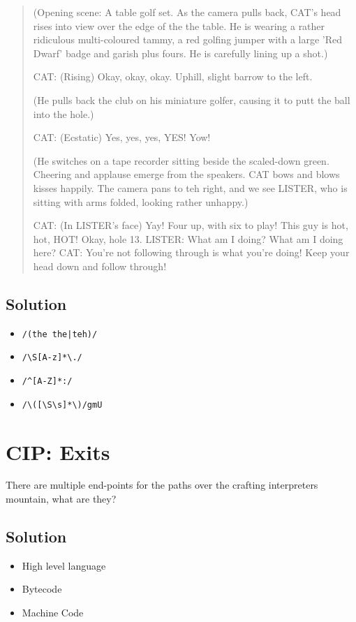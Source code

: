 \documentclass[twoside=false, DIV=14]{scrartcl}
\begin{document}
  \begin{quote}
  (Opening scene:  A table golf set.  As the camera pulls back, CAT's head
  rises into view over the edge of the the table.  He is wearing a rather
  ridiculous multi-coloured tammy, a red golfing jumper with a large 'Red
  Dwarf' badge and garish plus fours.  He is carefully lining up a shot.)
  
  CAT: (Rising) Okay, okay, okay.  Uphill, slight barrow to the left.
   
  (He pulls back the club on his miniature golfer, causing it to putt the
  ball into the hole.)
   
  CAT: (Ecstatic) Yes, yes, yes, YES!  Yow!
   
  (He switches on a tape recorder sitting beside the scaled-down green.
  Cheering and applause emerge from the speakers.  CAT bows and blows
  kisses happily.  The camera pans to teh right, and we see LISTER, who is
  sitting with arms folded, looking rather unhappy.)
   
  CAT: (In LISTER's face) Yay!  Four up, with six to play!  This guy is
  hot, hot, HOT!  Okay, hole 13.
  LISTER: What am I doing?  What am I doing here?
  CAT: You're not following through is what you're doing!  Keep your head
  down and follow through!
  \end{quote}
\subsection*{Solution}
\begin{itemize}
  \item \lstinline`/(the the|teh)/`
  \item \lstinline`/\S[A-z]*\./`
  \item \lstinline`/^[A-Z]*:/`
  \item \lstinline`/\([\S\s]*\)/gmU`
\end{itemize}



\section*{CIP: Exits}
  There are multiple end-points for the paths over the crafting interpreters mountain, what are they?
\subsection*{Solution}
    \begin{itemize}
      \item High level language
      \item Bytecode
      \item Machine Code
    \end{itemize}
\end{document}
